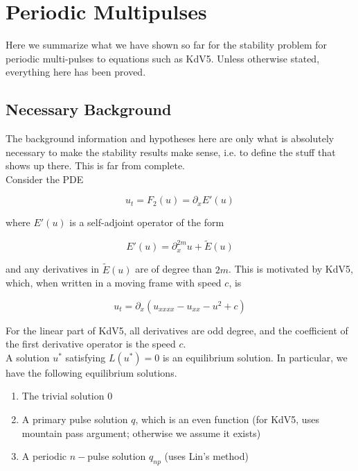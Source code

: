 \documentclass[12pt]{article}
\begin{document}
\section{Periodic Multipulses}

Here we summarize what we have shown so far for the stability problem for periodic multi-pulses to equations such as KdV5. Unless otherwise stated, everything here has been proved.

\subsection{Necessary Background}

The background information and hypotheses here are only what is absolutely necessary to make the stability results make sense, i.e. to define the stuff that shows up there. This is far from complete.\\

Consider the PDE

\begin{equation}\label{PDE}
u_t = F_2(u) = \partial_x E'(u)
\end{equation}

where $E'(u)$ is a self-adjoint operator of the form

\[
E'(u) = \partial_x^{2m}u + \tilde{E}(u)
\]

and any derivatives in $\tilde{E}(u)$ are of degree than $2m$. This is motivated by KdV5, which, when written in a moving frame with speed $c$, is

\begin{equation}\label{KdV5}
u_t = \partial_x(u_{xxxx} - u_{xx} - u^2 + c)
\end{equation}

For the linear part of KdV5, all derivatives are odd degree, and the coefficient of the first derivative operator is the speed $c$.\\

A solution $u^*$ satisfying $L(u^*) = 0$ is an equilibrium solution. In particular, we have the following equilibrium solutions.

\begin{enumerate}
	\item The trivial solution 0
	\item A primary pulse solution $q$, which is an even function (for KdV5, uses mountain pass argument; otherwise we assume it exists)
	\item A periodic $n-$pulse solution $q_{np}$ (uses Lin's method)
\end{enumerate}
\end{document}
